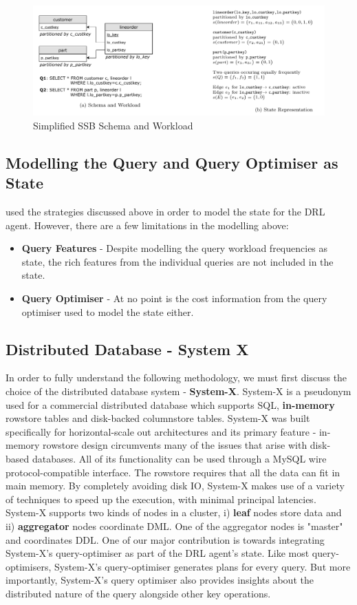\begin{figure}[h]
  \centering
  \includegraphics[width=\linewidth]{figures/simplified-ssb-schema-workload.png}
  \caption{Simplified SSB Schema and Workload}
  \label{fig:state-rep}

\end{figure}

\subsection{Modelling the Query and Query Optimiser as State}
\citeauthor{Hilprecht:2019:TLP:3329859.3329876} used the strategies discussed above in order to model the state for the DRL agent. However, there are a few limitations in the modelling above:
\begin{itemize}
    \item \textbf{Query Features} - Despite modelling the query workload frequencies as state, the rich features from the individual queries are not included in the state. 
    \item \textbf{Query Optimiser} - At no point is the cost information from the query optimiser used to model the state either. 
\end{itemize}

\subsection{Distributed Database - System X}
In order to fully understand the following methodology, we must first discuss the choice of the distributed database system - \textbf{System-X}. System-X is a pseudonym used for a commercial distributed database which supports SQL, \textbf{in-memory} rowstore tables and disk-backed columnstore tables. System-X was built specifically for horizontal-scale out architectures and its primary feature - in-memory rowstore design circumvents many of the issues that arise with disk-based databases. All of its functionality can be used through a MySQL wire protocol-compatible interface. The rowstore requires that all the data can fit in main memory. By completely avoiding disk IO, System-X makes use of a variety of techniques to speed up the execution, with minimal principal latencies. System-X supports two kinds of nodes in a cluster, i) \textbf{leaf} nodes store data and ii) \textbf{aggregator} nodes coordinate DML. One of the aggregator nodes is "master" and coordinates DDL. One of our major contribution is towards integrating System-X's query-optimiser as part of the DRL agent's state. Like most query-optimisers, System-X's query-optimiser generates plans for every query. But more importantly, System-X's query optimiser also provides insights about the distributed nature of the query alongside other key operations.


